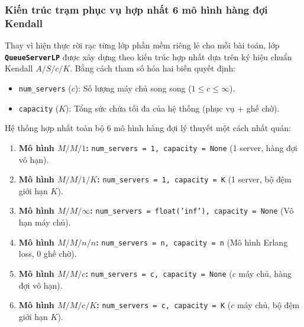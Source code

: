 \subsubsection{Kiến trúc trạm phục vụ hợp nhất 6 mô hình hàng đợi Kendall}
\label{subsubsec:unified-queue-server}

\hspace{0.5cm}Thay vì hiện thực rời rạc từng lớp phần mềm riêng lẻ cho mỗi bài toán, lớp \textbf{\texttt{QueueServerLP}} được xây dựng theo kiến trúc hợp nhất dựa trên ký hiệu chuẩn Kendall $A/S/c/K$. Bằng cách tham số hóa hai biến quyết định:
\begin{itemize}[leftmargin=1.5em, itemsep=2pt]
\item \texttt{num\_servers} ($c$): Số lượng máy chủ song song ($1 \le c \le \infty$).
\item \texttt{capacity} ($K$): Tổng sức chứa tối đa của hệ thống (phục vụ + ghế chờ).
\end{itemize}

Hệ thống hợp nhất toàn bộ 6 mô hình hàng đợi lý thuyết một cách nhất quán:
\begin{enumerate}[leftmargin=2em, itemsep=2pt]
\item \textbf{Mô hình $M/M/1$:} \texttt{num\_servers = 1, capacity = None} (1 server, hàng đợi vô hạn).
\item \textbf{Mô hình $M/M/1/K$:} \texttt{num\_servers = 1, capacity = K} (1 server, bộ đệm giới hạn $K$).
\item \textbf{Mô hình $M/M/\infty$:} \texttt{num\_servers = float('inf'), capacity = None} (Vô hạn máy chủ).
\item \textbf{Mô hình $M/M/n/n$:} \texttt{num\_servers = n, capacity = n} (Mô hình Erlang loss, $0$ ghế chờ).
\item \textbf{Mô hình $M/M/c$:} \texttt{num\_servers = c, capacity = None} ($c$ máy chủ, hàng đợi vô hạn).
\item \textbf{Mô hình $M/M/c/K$:} \texttt{num\_servers = c, capacity = K} ($c$ máy chủ, bộ đệm giới hạn $K$).
\end{enumerate}


